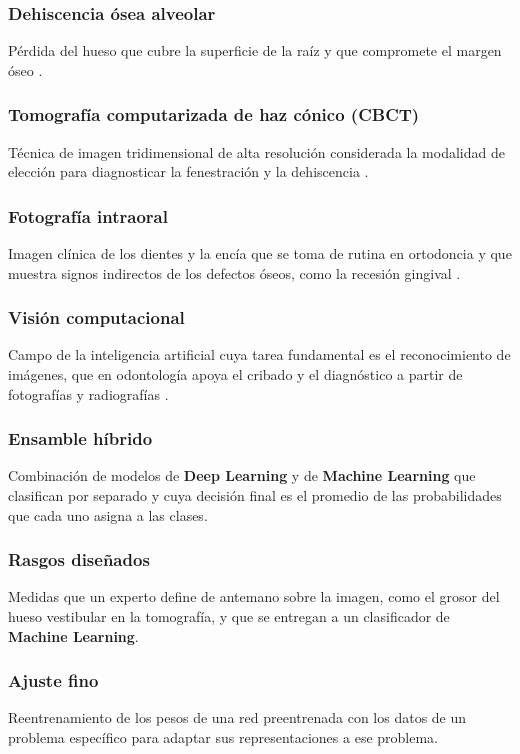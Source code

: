 \documentclass[12pt,a4paper]{article}
\newcommand{\sol}[1]{\textcolor{solucion}{\textbf{#1}}}
\newcommand{\sol}[1]{#1}
\begin{document}
\subsubsection{Dehiscencia ósea alveolar}
Pérdida del hueso que cubre la superficie de la raíz y que compromete el
margen óseo \parencite{liu2025fdtooth}.

\subsubsection{Tomografía computarizada de haz cónico (CBCT)}
Técnica de imagen tridimensional de alta resolución considerada la
modalidad de elección para diagnosticar la fenestración y la dehiscencia
\parencite{liu2025fdtooth}.

\subsubsection{Fotografía intraoral}
Imagen clínica de los dientes y la encía que se toma de rutina en
ortodoncia y que muestra signos indirectos de los defectos óseos, como la
recesión gingival \parencite{liu2025fdtooth}.

\subsubsection{Visión computacional}
Campo de la inteligencia artificial cuya tarea fundamental es el
reconocimiento de imágenes, que en odontología apoya el cribado y el
diagnóstico a partir de fotografías y radiografías
\parencite{yuan2026integrating}.

\subsubsection{Ensamble híbrido}
Combinación de modelos de \sol{Deep Learning} y de \sol{Machine
Learning} que clasifican por separado y cuya decisión final es el
promedio de las probabilidades que cada uno asigna a las clases.

\subsubsection{Rasgos diseñados}
Medidas que un experto define de antemano sobre la imagen, como el
grosor del hueso vestibular en la tomografía, y que se entregan a un
clasificador de \sol{Machine Learning}.

\subsubsection{Ajuste fino}
Reentrenamiento de los pesos de una red preentrenada con los datos de un
problema específico para adaptar sus representaciones a ese problema.
\end{document}
